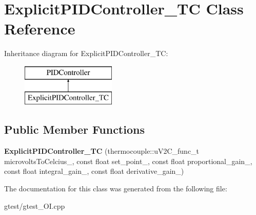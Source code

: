 \hypertarget{class_explicit_p_i_d_controller___t_c}{\section{Explicit\-P\-I\-D\-Controller\-\_\-\-T\-C Class Reference}
\label{class_explicit_p_i_d_controller___t_c}
}
Inheritance diagram for Explicit\-P\-I\-D\-Controller\-\_\-\-T\-C\-:\begin{figure}[H]
\begin{center}
\leavevmode
\includegraphics[height=2.000000cm]{class_explicit_p_i_d_controller___t_c}
\end{center}
\end{figure}
\subsection*{Public Member Functions}
\begin{DoxyCompactItemize}
\item 
\hypertarget{class_explicit_p_i_d_controller___t_c_a12c161f5a94c812de6c2d524edeb785e}{{\bfseries Explicit\-P\-I\-D\-Controller\-\_\-\-T\-C} (thermocouple\-::u\-V2\-C\-\_\-func\-\_\-t microvolts\-To\-Celcius\-\_\-, const float set\-\_\-point\-\_\-, const float proportional\-\_\-gain\-\_\-, const float integral\-\_\-gain\-\_\-, const float derivative\-\_\-gain\-\_\-)}\label{class_explicit_p_i_d_controller___t_c_a12c161f5a94c812de6c2d524edeb785e}

\end{DoxyCompactItemize}


The documentation for this class was generated from the following file\-:\begin{DoxyCompactItemize}
\item 
gtest/gtest\-\_\-\-O\-I.\-cpp\end{DoxyCompactItemize}
